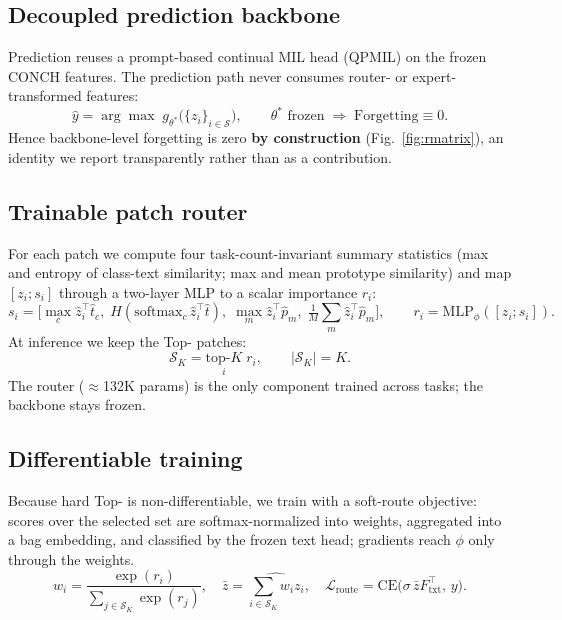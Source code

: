 \subsection{Decoupled prediction backbone}
Prediction reuses a prompt-based continual MIL head (QPMIL) on the frozen CONCH
features. The prediction path never consumes router- or expert-transformed
features:
\begin{equation}
\hat{y} = \arg\max\; g_{\theta^\ast}\!\big(\{z_i\}_{i\in\mathcal{S}}\big),
\qquad \theta^\ast \text{ frozen}\;\Rightarrow\;
\mathrm{Forgetting}\equiv 0 .
\label{eq:decouple}
\end{equation}
Hence backbone-level forgetting is zero \textbf{by construction}
(Fig.~\ref{fig:rmatrix}), an identity we report transparently rather than as a
contribution.

\subsection{Trainable patch router}
For each patch we compute four task-count-invariant summary statistics (max and
entropy of class-text similarity; max and mean prototype similarity) and map
$[z_i;s_i]$ through a two-layer MLP to a scalar importance $r_i$:
\begin{equation}
s_i = \Big[\max_c \hat{z}_i^\top \hat{t}_c,\;
           H(\mathrm{softmax}_c\,\hat{z}_i^\top \hat{t}),\;
           \max_m \hat{z}_i^\top \hat{p}_m,\;
           \tfrac{1}{M}\textstyle\sum_m \hat{z}_i^\top \hat{p}_m\Big],
\qquad r_i = \mathrm{MLP}_\phi([z_i;s_i]).
\label{eq:score}
\end{equation}
At inference we keep the Top-\K{} patches:
\begin{equation}
\mathcal{S}_K = \underset{i}{\mathrm{top\text{-}}K}\; r_i,
\qquad |\mathcal{S}_K|=K.
\label{eq:topk}
\end{equation}
The router ($\approx$132K params) is the only component trained across tasks;
the backbone stays frozen.

\subsection{Differentiable training}
Because hard Top-\K{} is non-differentiable, we train with a soft-route
objective: scores over the selected set are softmax-normalized into weights,
aggregated into a bag embedding, and classified by the frozen text head;
gradients reach $\phi$ only through the weights.
\begin{equation}
w_i=\frac{\exp(r_i)}{\sum_{j\in\mathcal{S}_K}\exp(r_j)},\quad
\bar{z}=\widehat{\textstyle\sum_{i\in\mathcal{S}_K} w_i z_i},\quad
\mathcal{L}_{\text{route}}=\mathrm{CE}\big(\sigma\,\bar{z}F_{\text{txt}}^\top,\,y\big).
\label{eq:softroute}
\end{equation}

